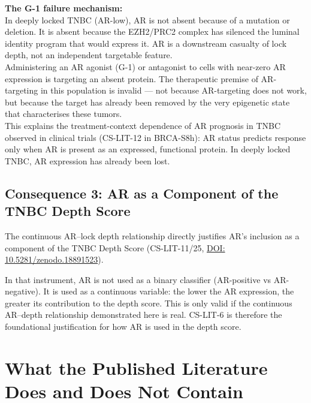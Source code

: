 \documentclass[12pt, a4paper]{article}
\begin{document}
\begin{center}
\colorbox{warnbox}{
\begin{minipage}{0.88\textwidth}
\vspace{0.5em}
\textbf{The G-1 failure mechanism:}\\[0.4em]
In deeply locked TNBC (AR-low), AR is not
absent because of a mutation or deletion.
It is absent because the EZH2/PRC2 complex
has silenced the luminal identity program
that would express it. AR is a downstream
casualty of lock depth, not an independent
targetable feature.\\[0.4em]
Administering an AR agonist (G-1) or antagonist
to cells with near-zero AR expression is
targeting an absent protein. The therapeutic
premise of AR-targeting in this population
is invalid --- not because AR-targeting does
not work, but because the target has already
been removed by the very epigenetic state
that characterises these tumors.\\[0.4em]
This explains the treatment-context dependence
of AR prognosis in TNBC observed in clinical
trials (CS-LIT-12 in BRCA-S8h): AR status
predicts response only when AR is present
as an expressed, functional protein. In
deeply locked TNBC, AR expression has already
been lost.
\vspace{0.5em}
\end{minipage}}
\end{center}

\subsection{Consequence 3: AR as a Component
of the TNBC Depth Score}

The continuous AR--lock depth relationship
directly justifies AR's inclusion as a
component of the TNBC Depth Score
(CS-LIT-11/25,
\href{https://doi.org/10.5281/zenodo.18891523}
{DOI: 10.5281/zenodo.18891523}).

In that instrument, AR is not used as a binary
classifier (AR-positive vs AR-negative). It is
used as a continuous variable: the lower the AR
expression, the greater its contribution to the
depth score. This is only valid if the continuous
AR--depth relationship demonstrated here is real.
CS-LIT-6 is therefore the foundational
justification for how AR is used in the
depth score.

\section{What the Published Literature Does and
Does Not Contain}
\end{document}

